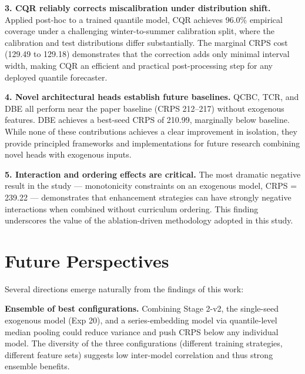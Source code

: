 \vspace{0.3cm}

\noindent
\textbf{3. CQR reliably corrects miscalibration under distribution shift.}
Applied post-hoc to a trained quantile model, CQR achieves 96.0\%
empirical coverage under a challenging winter-to-summer calibration
split, where the calibration and test distributions differ substantially.
The marginal CRPS cost (129.49 to 129.18) demonstrates that the
correction adds only minimal interval width, making CQR an efficient
and practical post-processing step for any deployed quantile forecaster.

\vspace{0.3cm}

\noindent
\textbf{4. Novel architectural heads establish future baselines.}
QCBC, TCR, and DBE all perform near the paper baseline (CRPS 212--217)
without exogenous features. DBE achieves a best-seed CRPS of 210.99,
marginally below baseline. While none of these contributions achieves
a clear improvement in isolation, they provide principled frameworks
and implementations for future research combining novel heads with
exogenous inputs.

\vspace{0.3cm}

\noindent
\textbf{5. Interaction and ordering effects are critical.}
The most dramatic negative result in the study --- monotonicity
constraints on an exogenous model, CRPS = 239.22 --- demonstrates
that enhancement strategies can have strongly negative interactions
when combined without curriculum ordering. This finding underscores
the value of the ablation-driven methodology adopted in this study.

\vspace{0.8cm}

\section*{Future Perspectives}

\noindent
Several directions emerge naturally from the findings of this work:

\vspace{0.3cm}

\noindent
\textbf{Ensemble of best configurations.}
Combining Stage 2-v2, the single-seed exogenous model (Exp 20), and a
series-embedding model via quantile-level median pooling could reduce
variance and push CRPS below any individual model. The diversity
of the three configurations (different training strategies, different
feature sets) suggests low inter-model correlation and thus strong
ensemble benefits.

